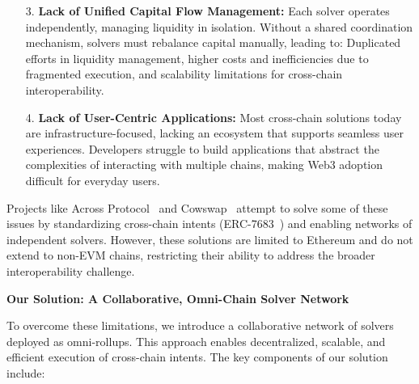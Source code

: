 \begin{itemize}
    \item[3.] \textbf{Lack of Unified Capital Flow Management:} Each solver operates independently, managing liquidity in isolation. Without a shared coordination mechanism, solvers must rebalance capital manually, leading to: Duplicated efforts in liquidity management, higher costs and inefficiencies due to fragmented execution, and scalability limitations for cross-chain interoperability.

    \item[4.] \textbf{Lack of User-Centric Applications:} Most cross-chain solutions today are infrastructure-focused, lacking an ecosystem that supports seamless user experiences. Developers struggle to build applications that abstract the complexities of interacting with multiple chains, making Web3 adoption difficult for everyday users.    
\end{itemize}


Projects like Across Protocol~\cite{across} and Cowswap~\cite{cowswap} attempt to solve some of these issues by standardizing cross-chain intents (ERC-7683~\cite{erc}) and enabling networks of independent solvers. However, these solutions are limited to Ethereum and do not extend to non-EVM chains, restricting their ability to address the broader interoperability challenge.

\textbf{Our Solution: A Collaborative, Omni-Chain Solver Network}

To overcome these limitations, we introduce a collaborative network of solvers deployed as omni-rollups. This approach enables decentralized, scalable, and efficient execution of cross-chain intents. The key components of our solution include:

